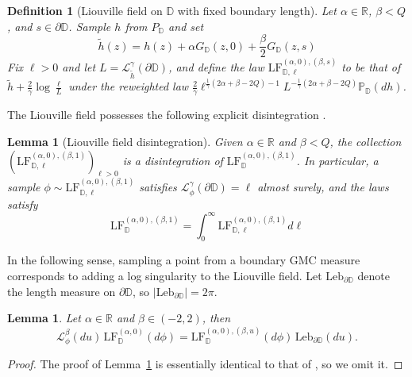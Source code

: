\documentclass[a4paper]{article}
\numberwithin{equation}{section}
\newcommand{\bbD}{\mathbb{D}}
\newcommand{\D}{\mathbb{D}}
\newcommand{\R}{\mathbb{R}}
\renewcommand{\P}{\mathbb{P}}
\newcommand{\cL}{\mathcal{L}}
\newcommand{\LF}{\mathrm{LF}}
\newtheorem{lemma}[theorem]{Lemma}
\newtheorem{definition}[theorem]{Definition}
\theoremstyle{remark}
\numberwithin{equation}{section}
\begin{document}
\begin{definition}[Liouville field on $\mathbb{D}$ with fixed boundary length]\label{def-lf-conditioned}
Let $\alpha \in \R$, $\beta < Q$, and $s \in \partial \D$. Sample $h$ from $P_\D$ and set
\begin{equation*}
    \tilde h(z) = h(z) + \alpha G_\bbD(z,0)+\frac{\beta}{2}G_\bbD(z,s)
\end{equation*}
Fix $\ell > 0$ and let $L = \cL^\gamma_{\tilde h}(\partial \D)$, and define the law $\LF_{\D, \ell}^{(\alpha, 0), (\beta, s)}$ to be that of $\tilde h + \frac{2}{\gamma}\log \frac{\ell}{L}$ under the reweighted law $\frac{2}{\gamma} \ell^{\frac1\gamma(2\alpha + \beta - 2Q) - 1} L^{- \frac1\gamma(2\alpha + \beta - 2Q)} \P_{\D}(dh)$.
\end{definition}

The Liouville field possesses the following explicit disintegration \cite[Lemma 2.7]{ay-reversibility}.

\begin{lemma}[Liouville field disintegration]\label{lem-disint-explicit}
    Given $\alpha \in \R$ and $\beta < Q$, the collection $(\LF_{\D, \ell}^{(\alpha, 0), (\beta, 1)})_{\ell > 0}$ is a disintegration of $\LF_{\D}^{(\alpha, 0), (\beta, 1)}$. In particular, a sample $\phi \sim \LF_{\D, \ell}^{(\alpha, 0), (\beta, 1)}$ satisfies $\cL_{\phi}^{\gamma}(\partial \D) = \ell$ almost surely, and the laws satisfy
    \begin{equation*}\label{eq-disint}
        \LF_{\D}^{(\alpha, 0), (\beta, 1)} = \int_{0}^{\infty}\LF_{\D, \ell}^{(\alpha, 0), (\beta, 1)}d\ell
    \end{equation*}
\end{lemma}

In the following sense, sampling a point from a boundary GMC measure corresponds to adding a log singularity to the Liouville field. Let $\mathrm{Leb}_{\partial \D}$ denote the length measure on $\partial \D$, so $|\mathrm{Leb}_{\partial \D}| = 2\pi$.
\begin{lemma}\label{lem-sample-gmc}
    Let $\alpha \in \R$ and $\beta \in (-2,2)$, then 
    \[ \cL_\phi^\beta(du)\, \LF_\D^{(\alpha,0)}(d\phi) = \LF_\D^{(\alpha, 0),(\beta,u)} (d\phi) \, \mathrm{Leb}_{\partial \D} (du).\]
\end{lemma}
\begin{proof}
    The proof of Lemma~\ref{lem-sample-gmc} is essentially identical to that of \cite[Lemma 2.31]{ahs-integrability}, so we omit it.
\end{proof}
\end{document}
